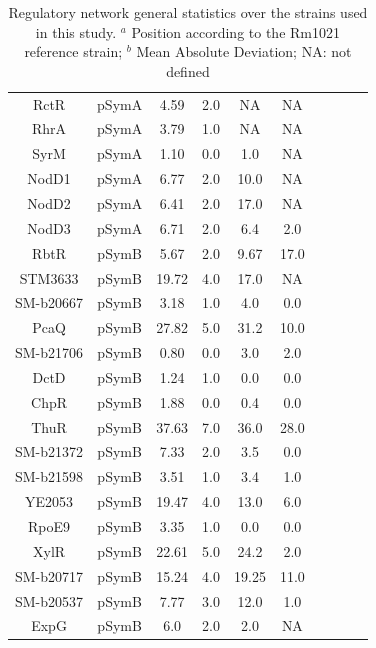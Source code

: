 \begin{table}[!ht]
\begin{tabular}{ c c c c c c c c c c }
    RctR       & pSymA        & 4.59  & 2.0  & NA           & NA  \\
    RhrA       & pSymA        & 3.79  & 1.0  & NA           & NA  \\
    SyrM       & pSymA        & 1.10  & 0.0  & 1.0           & NA  \\
    NodD1      & pSymA        & 6.77  & 2.0  & 10.0          & NA \\
    NodD2      & pSymA        & 6.41  & 2.0  & 17.0          & NA \\
    NodD3      & pSymA        & 6.71  & 2.0  & 6.4           & 2.0 \\
    RbtR       & pSymB        & 5.67  & 2.0  & 9.67 & 17.0 \\
    STM3633    & pSymB        & 19.72          & 4.0  & 17.0          & NA \\
    SM-b20667  & pSymB        & 3.18  & 1.0  & 4.0           & 0.0  \\
    PcaQ       & pSymB        & 27.82  & 5.0  & 31.2          & 10.0 \\
    SM-b21706  & pSymB        & 0.80 & 0.0  & 3.0           & 2.0  \\
    DctD       & pSymB        & 1.24  & 1.0  & 0.0           & 0.0  \\
    ChpR       & pSymB        & 1.88  & 0.0  & 0.4           & 0.0  \\
    ThuR       & pSymB        & 37.63  & 7.0  & 36.0          & 28.0 \\
    SM-b21372  & pSymB        & 7.33  & 2.0  & 3.5           & 0.0  \\
    SM-b21598  & pSymB        & 3.51  & 1.0  & 3.4           & 1.0  \\
    YE2053     & pSymB        & 19.47  & 4.0 & 13.0          & 6.0 \\
    RpoE9      & pSymB        & 3.35  & 1.0 & 0.0           & 0.0  \\
    XylR       & pSymB        & 22.61  & 5.0 & 24.2          & 2.0 \\
    SM-b20717  & pSymB        & 15.24  & 4.0 & 19.25         & 11.0 \\
    SM-b20537  & pSymB        & 7.77  & 3.0 & 12.0          & 1.0 \\
    ExpG       & pSymB        & 6.0            & 2.0 & 2.0           & NA  \\
\hline
\end{tabular}
\caption{\label{tab:regulonstats} Regulatory network general statistics over the strains used in this study. $^{a}$ Position according to the Rm1021 reference strain; $^{b}$ Mean Absolute Deviation; NA: not defined}
\end{table}
